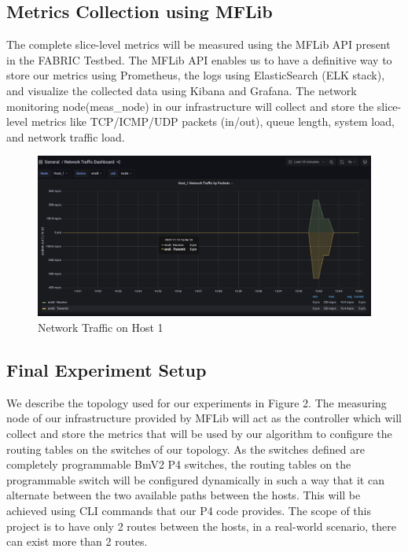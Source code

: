 \documentclass[conference]{IEEEtran}
\begin{document}
    \subsection{Metrics Collection using MFLib}
    The complete slice-level metrics will be measured using the MFLib API present in the FABRIC Testbed. The MFLib API enables us to have a definitive way to store our metrics using Prometheus, the logs using ElasticSearch (ELK stack), and visualize the collected data using Kibana and Grafana. The network monitoring node(meas\_node) in our infrastructure will collect and store the slice-level metrics like TCP/ICMP/UDP packets (in/out), queue length, system load, and network traffic load.

    \begin{figure}[h!]
        \includegraphics[scale=0.15]{Graph2.png}
        \centering
        \caption{Network Traffic on Host 1}
    \end{figure}

    \subsection{Final Experiment Setup}
    We describe the topology used for our experiments in Figure 2. The measuring node of our infrastructure provided by MFLib will act as the controller which will collect and store the metrics that will be used by our algorithm to configure the routing tables on the switches of our topology. As the switches defined are completely programmable BmV2 P4 switches, the routing tables on the programmable switch will be configured dynamically in such a way that it can alternate between the two available paths between the hosts. This will be achieved using CLI commands that our P4 code provides.
    The scope of this project is to have only 2 routes between the hosts, in a real-world scenario, there can exist more than 2 routes.
\end{document}

